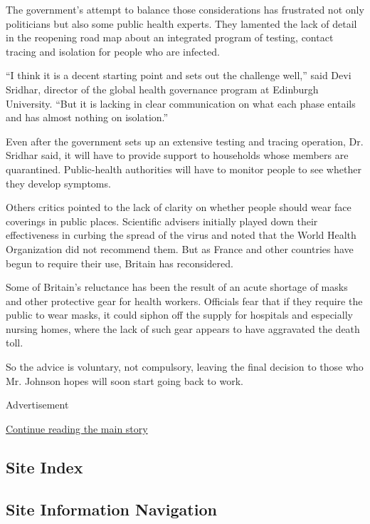 The government's attempt to balance those considerations has frustrated
not only politicians but also some public health experts. They lamented
the lack of detail in the reopening road map about an integrated program
of testing, contact tracing and isolation for people who are infected.

``I think it is a decent starting point and sets out the challenge
well,'' said Devi Sridhar, director of the global health governance
program at Edinburgh University. ``But it is lacking in clear
communication on what each phase entails and has almost nothing on
isolation.''

Even after the government sets up an extensive testing and tracing
operation, Dr. Sridhar said, it will have to provide support to
households whose members are quarantined. Public-health authorities will
have to monitor people to see whether they develop symptoms.

Others critics pointed to the lack of clarity on whether people should
wear face coverings in public places. Scientific advisers initially
played down their effectiveness in curbing the spread of the virus and
noted that the World Health Organization did not recommend them. But as
France and other countries have begun to require their use, Britain has
reconsidered.

Some of Britain's reluctance has been the result of an acute shortage of
masks and other protective gear for health workers. Officials fear that
if they require the public to wear masks, it could siphon off the supply
for hospitals and especially nursing homes, where the lack of such gear
appears to have aggravated the death toll.

So the advice is voluntary, not compulsory, leaving the final decision
to those who Mr. Johnson hopes will soon start going back to work.

Advertisement

\protect\hyperlink{after-bottom}{Continue reading the main story}

\hypertarget{site-index}{%
\subsection{Site Index}\label{site-index}}

\hypertarget{site-information-navigation}{%
\subsection{Site Information
Navigation}\label{site-information-navigation}}

